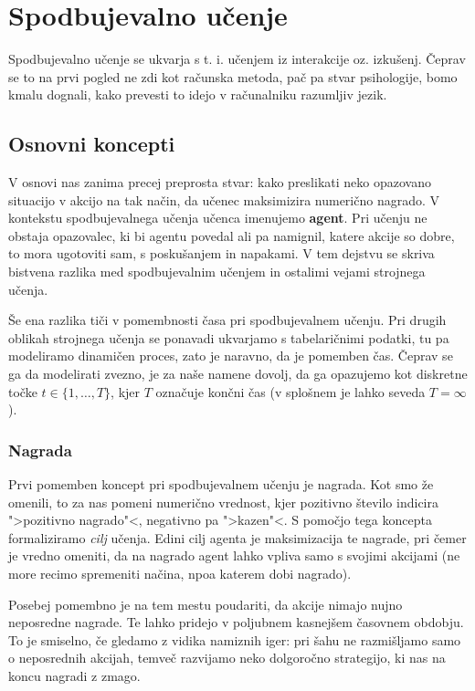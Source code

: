 \documentclass[12pt,a4paper]{amsart}
\theoremstyle{definition} %
\theoremstyle{plain} %
\begin{document}
\section{Spodbujevalno učenje}
Spodbujevalno učenje se ukvarja s t. i. učenjem iz interakcije oz. izkušenj. Čeprav se to na prvi 
pogled ne zdi kot računska metoda, pač pa stvar psihologije, bomo kmalu dognali, kako prevesti 
to idejo v računalniku razumljiv jezik.

\subsection{Osnovni koncepti}
V osnovi nas zanima precej preprosta stvar: kako preslikati neko opazovano situacijo v akcijo na 
tak način, da učenec maksimizira numerično nagrado. V kontekstu spodbujevalnega učenja učenca  
imenujemo \textbf{agent}. Pri učenju ne obstaja opazovalec, ki bi agentu povedal ali pa namignil, 
katere akcije so dobre, to mora ugotoviti sam, s poskušanjem in napakami. V tem dejstvu se skriva 
bistvena razlika med spodbujevalnim učenjem in ostalimi vejami strojnega učenja. 

Še ena razlika tiči v pomembnosti časa pri spodbujevalnem učenju. Pri drugih oblikah 
strojnega učenja se ponavadi ukvarjamo s tabelaričnimi podatki, tu pa modeliramo 
dinamičen proces, zato je naravno, da je pomemben čas. Čeprav se ga da 
modelirati zvezno, je za naše namene dovolj, da ga opazujemo kot diskretne točke $t \in 
\{1, \dots, T\} $, kjer $T$ označuje končni čas (v splošnem je lahko seveda $T = \infty$).

\subsubsection{Nagrada}
Prvi pomemben koncept pri spodbujevalnem učenju je nagrada. Kot smo že omenili, to za nas 
pomeni numerično vrednost, kjer pozitivno število indicira ">pozitivno nagrado"<, negativno pa 
">kazen"<. S pomočjo tega koncepta formaliziramo \textit{cilj} učenja. Edini cilj agenta je 
maksimizacija te nagrade, pri čemer je vredno omeniti, da na nagrado agent lahko vpliva samo 
s svojimi akcijami (ne more recimo spremeniti načina, npoa katerem dobi nagrado). 

Posebej pomembno je na tem mestu poudariti, da akcije nimajo nujno neposredne nagrade. Te 
lahko pridejo v poljubnem kasnejšem časovnem obdobju. To je smiselno, če gledamo z vidika 
namiznih iger: pri šahu ne razmišljamo samo o neposrednih akcijah, temveč razvijamo neko 
dolgoročno strategijo, ki nas na koncu nagradi z zmago. 
\end{document}
